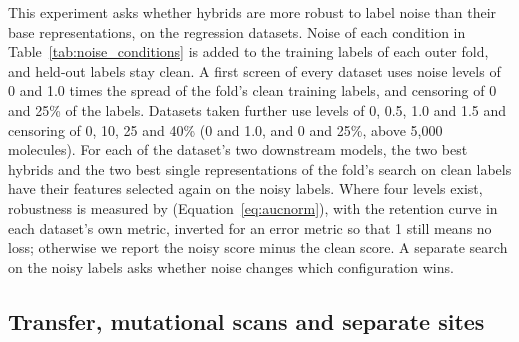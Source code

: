 This experiment asks whether hybrids are more robust to label noise than their base representations, on the regression datasets. Noise of each condition in Table~\ref{tab:noise_conditions} is added to the training labels of each outer fold, and held-out labels stay clean. A first screen of every dataset uses noise levels of 0 and 1.0 times the spread of the fold's clean training labels, and censoring of 0 and 25\% of the labels. Datasets taken further use levels of 0, 0.5, 1.0 and 1.5 and censoring of 0, 10, 25 and 40\% (0 and 1.0, and 0 and 25\%, above 5,000 molecules). For each of the dataset's two downstream models, the two best hybrids and the two best single representations of the fold's search on clean labels have their features selected again on the noisy labels. Where four levels exist, robustness is measured by \aucnorm{} (Equation~\ref{eq:aucnorm}), with the retention curve in each dataset's own metric, inverted for an error metric so that 1 still means no loss; otherwise we report the noisy score minus the clean score. A separate search on the noisy labels asks whether noise changes which configuration wins.



\subsection{Transfer, mutational scans and separate sites}\label{sec:method:sites}


